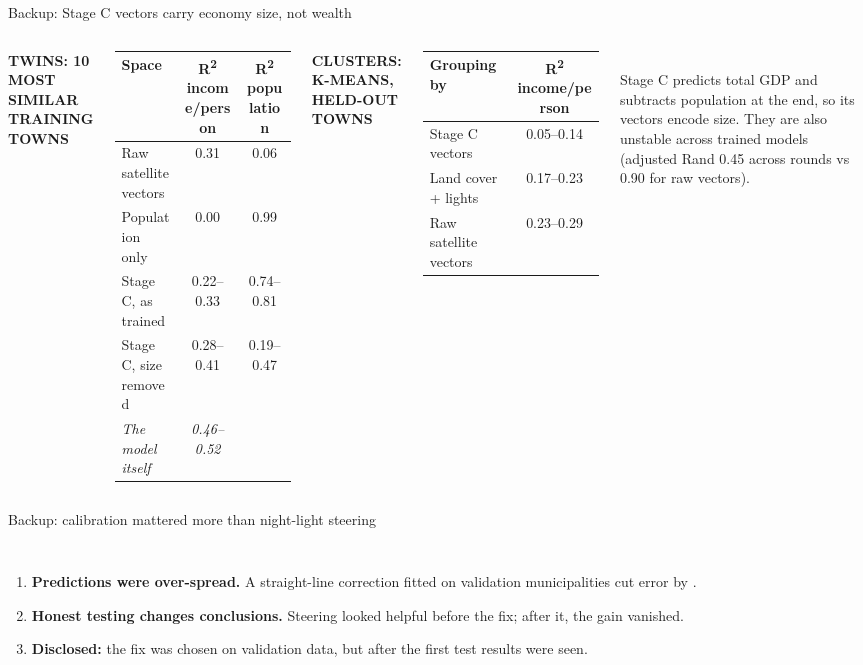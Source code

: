 \documentclass[aspectratio=169,10pt]{beamer}
\newcommand{\eyebrow}[2][muted]{{\fontsize{6.5}{8}\selectfont\bfseries\color{#1}\addfontfeatures{LetterSpace=8}\MakeUppercase{#2}}}
\newcommand{\fnote}[1]{{\fontsize{7}{8.5}\selectfont\color{muted}#1}}
\begin{document}
\begin{frame}{Backup: Stage C vectors carry economy size, not wealth}
\begin{columns}[T,onlytextwidth]
\eyebrow{Twins: 10 most similar training towns}\\[4pt]
{\renewcommand{\arraystretch}{1.25}\footnotesize
\begin{tabular}{@{}lcc@{}}
\toprule
Space & R\textsuperscript{2} income/person & R\textsuperscript{2} population\\
\midrule
Raw satellite vectors & 0.31 & 0.06\\
Population only & 0.00 & 0.99\\
Stage C, as trained & 0.22--0.33 & 0.74--0.81\\
Stage C, size removed & 0.28--0.41 & 0.19--0.47\\
\textit{The model itself} & \textit{0.46--0.52} & \\
\bottomrule
\end{tabular}}
\eyebrow{Clusters: k-means, held-out towns}\\[4pt]
{\renewcommand{\arraystretch}{1.25}\footnotesize
\begin{tabular}{@{}lc@{}}
\toprule
Grouping by & R\textsuperscript{2} income/person\\
\midrule
Stage C vectors & 0.05--0.14\\
Land cover + lights & 0.17--0.23\\
Raw satellite vectors & 0.23--0.29\\
\bottomrule
\end{tabular}}\\[6pt]
\fnote{Stage C predicts total GDP and subtracts population at the end, so its vectors encode size. They are also
unstable across trained models (adjusted Rand 0.45 across rounds vs 0.90 for raw vectors).}
\end{columns}
\end{frame}

\begin{frame}{Backup: calibration mattered more than night-light steering}
\begin{columns}[c,onlytextwidth]
\centering\resizebox{\linewidth}{!}{}
\begin{enumerate}\setlength{\itemsep}{9pt}\small
  \item \textbf{Predictions were over-spread.} A straight-line correction fitted on validation municipalities
        cut error by {\bfseries\color{okc}\nCalibGain}.
  \item \textbf{Honest testing changes conclusions.} Steering looked helpful before the fix; after it, the gain vanished.
  \item \textbf{Disclosed:} the fix was chosen on validation data, but after the first test results were seen.
\end{enumerate}
\end{columns}
\end{frame}
\end{document}
